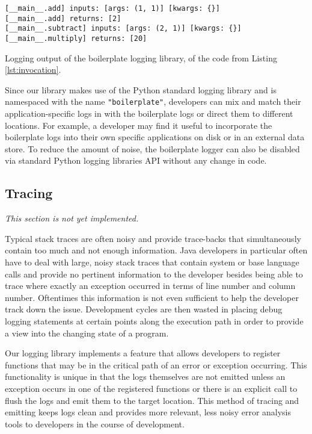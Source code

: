 \documentclass[acmsmall,review,authorversion]{acmart}
\newcommand{\code}[1]{\lstinline[basicstyle=\ttfamily\small]~#1~}
\begin{document}
\begin{listing}[H]
    \begin{verbatim}
[__main__.add] inputs: [args: (1, 1)] [kwargs: {}]
[__main__.add] returns: [2]
[__main__.subtract] inputs: [args: (2, 1)] [kwargs: {}]
[__main__.multiply] returns: [20]
    \end{verbatim}
    \caption{Logging output of the boilerplate logging library, of the code from Listing \ref{lst:invocation}.}
    \label{lst:log-examples}
\end{listing}

Since our library makes use of the Python standard logging library and is namespaced with the name \code{"boilerplate"}, developers can mix and match their application-specific logs in with the boilerplate logs or direct them to different locations. For example, a developer may find it useful to incorporate the boilerplate logs into their own specific applications on disk or in an external data store. To reduce the amount of noise, the boilerplate logger can also be disabled via standard Python logging libraries API without any change in code.

\subsection{Tracing}

\textit{This section is not yet implemented.}

Typical stack traces are often noisy and provide trace-backs that simultaneously contain too much and not enough information. Java developers in particular often have to deal with large, noisy stack traces that contain system or base language calls and provide no pertinent information to the developer besides being able to trace where exactly an exception occurred in terms of line number and column number. Oftentimes this information is not even sufficient to help the developer track down the issue. Development cycles are then wasted in placing debug logging statements at certain points along the execution path in order to provide a view into the changing state of a program.

Our logging library implements a feature that allows developers to register functions that may be in the critical path of an error or exception occurring. This functionality is unique in that the logs themselves are not emitted unless an exception occurs in one of the registered functions or there is an explicit call to flush the logs and emit them to the target location. This method of tracing and emitting keeps logs clean and provides more relevant, less noisy error analysis tools to developers in the course of development.
\end{document}
